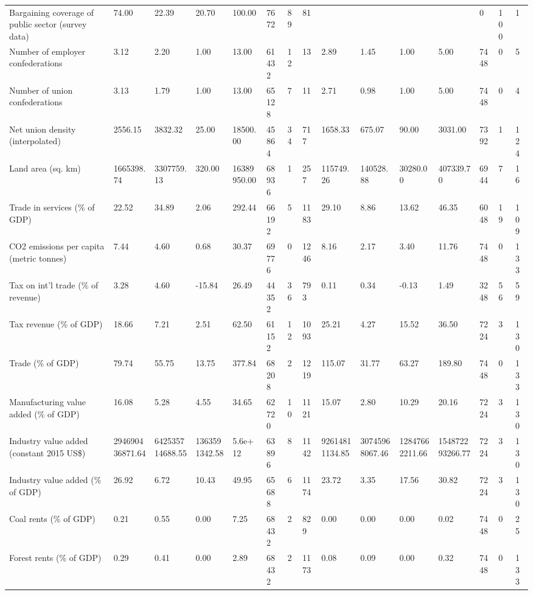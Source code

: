 \begin{longtable}{lllllllllllllll}
\addlinespace
Bargaining coverage of public sector (survey data) & 74.00 & 22.39 & 20.70 & 100.00 & 7672 & 89 & 81 &  &  &  &  & 0 & 100 & 1\\
Number of employer confederations & 3.12 & 2.20 & 1.00 & 13.00 & 61432 & 12 & 13 & 2.89 & 1.45 & 1.00 & 5.00 & 7448 & 0 & 5\\
Number of union confederations & 3.13 & 1.79 & 1.00 & 13.00 & 65128 & 7 & 11 & 2.71 & 0.98 & 1.00 & 5.00 & 7448 & 0 & 4\\
Net union density (interpolated) & 2556.15 & 3832.32 & 25.00 & 18500.00 & 45864 & 34 & 717 & 1658.33 & 675.07 & 90.00 & 3031.00 & 7392 & 1 & 124\\
Land area (sq. km) & 1665398.74 & 3307759.13 & 320.00 & 16389950.00 & 68936 & 1 & 257 & 115749.26 & 140528.88 & 30280.00 & 407339.70 & 6944 & 7 & 16\\
\addlinespace
Trade in services (\% of GDP) & 22.52 & 34.89 & 2.06 & 292.44 & 66192 & 5 & 1183 & 29.10 & 8.86 & 13.62 & 46.35 & 6048 & 19 & 109\\
CO2 emissions per capita (metric tonnes) & 7.44 & 4.60 & 0.68 & 30.37 & 69776 & 0 & 1246 & 8.16 & 2.17 & 3.40 & 11.76 & 7448 & 0 & 133\\
Tax on int'l trade (\% of revenue) & 3.28 & 4.60 & -15.84 & 26.49 & 44352 & 36 & 793 & 0.11 & 0.34 & -0.13 & 1.49 & 3248 & 56 & 59\\
Tax revenue (\% of GDP) & 18.66 & 7.21 & 2.51 & 62.50 & 61152 & 12 & 1093 & 25.21 & 4.27 & 15.52 & 36.50 & 7224 & 3 & 130\\
Trade (\% of GDP) & 79.74 & 55.75 & 13.75 & 377.84 & 68208 & 2 & 1219 & 115.07 & 31.77 & 63.27 & 189.80 & 7448 & 0 & 133\\
\addlinespace
Manufacturing value added (\% of GDP) & 16.08 & 5.28 & 4.55 & 34.65 & 62720 & 10 & 1121 & 15.07 & 2.80 & 10.29 & 20.16 & 7224 & 3 & 130\\
Industry value added (constant 2015 US\$) & 294690436871.64 & 642535714688.55 & 1363591342.58 & 5.6e+12 & 63896 & 8 & 1142 & 92614811134.85 & 30745968067.46 & 12847662211.66 & 154872293266.77 & 7224 & 3 & 130\\
Industry value added (\% of GDP) & 26.92 & 6.72 & 10.43 & 49.95 & 65688 & 6 & 1174 & 23.72 & 3.35 & 17.56 & 30.82 & 7224 & 3 & 130\\
Coal rents (\% of GDP) & 0.21 & 0.55 & 0.00 & 7.25 & 68432 & 2 & 829 & 0.00 & 0.00 & 0.00 & 0.02 & 7448 & 0 & 25\\
Forest rents (\% of GDP) & 0.29 & 0.41 & 0.00 & 2.89 & 68432 & 2 & 1173 & 0.08 & 0.09 & 0.00 & 0.32 & 7448 & 0 & 133\\

\end{longtable}
